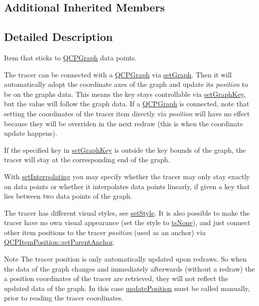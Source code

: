 \subsection*{Additional Inherited Members}


\subsection{Detailed Description}
Item that sticks to \hyperlink{classQCPGraph}{Q\+C\+P\+Graph} data points. 

 The tracer can be connected with a \hyperlink{classQCPGraph}{Q\+C\+P\+Graph} via \hyperlink{classQCPItemTracer_af5886f4ded8dd68cb4f3388f390790c0}{set\+Graph}. Then it will automatically adopt the coordinate axes of the graph and update its {\itshape position} to be on the graph\textquotesingle{}s data. This means the key stays controllable via \hyperlink{classQCPItemTracer_a6840143b42f3b685cedf7c6d83a704c8}{set\+Graph\+Key}, but the value will follow the graph data. If a \hyperlink{classQCPGraph}{Q\+C\+P\+Graph} is connected, note that setting the coordinates of the tracer item directly via {\itshape position} will have no effect because they will be overriden in the next redraw (this is when the coordinate update happens).

If the specified key in \hyperlink{classQCPItemTracer_a6840143b42f3b685cedf7c6d83a704c8}{set\+Graph\+Key} is outside the key bounds of the graph, the tracer will stay at the corresponding end of the graph.

With \hyperlink{classQCPItemTracer_a6c244a9d1175bef12b50afafd4f5fcd2}{set\+Interpolating} you may specify whether the tracer may only stay exactly on data points or whether it interpolates data points linearly, if given a key that lies between two data points of the graph.

The tracer has different visual styles, see \hyperlink{classQCPItemTracer_a41a2ac4f1acd7897b4e2a2579c03204e}{set\+Style}. It is also possible to make the tracer have no own visual appearance (set the style to \hyperlink{classQCPItemTracer_a2f05ddb13978036f902ca3ab47076500aac27462c79146225bfa8fba24d2ee8a4}{ts\+None}), and just connect other item positions to the tracer {\itshape position} (used as an anchor) via \hyperlink{classQCPItemPosition_ac094d67a95d2dceafa0d50b9db3a7e51}{Q\+C\+P\+Item\+Position\+::set\+Parent\+Anchor}.

\begin{DoxyNote}{Note}
The tracer position is only automatically updated upon redraws. So when the data of the graph changes and immediately afterwards (without a redraw) the a position coordinates of the tracer are retrieved, they will not reflect the updated data of the graph. In this case \hyperlink{classQCPItemTracer_a5b90296109e36384aedbc8908a670413}{update\+Position} must be called manually, prior to reading the tracer coordinates. 
\end{DoxyNote}


